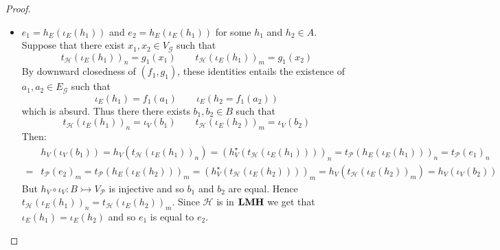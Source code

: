 \documentclass[3p]{elsarticle}
\newcommand{\catname}[1]{\textbf{\textup{#1}}}
\newcommand{\lmo}{\catname{LMH}}
\newcommand{\mto}{\rightarrowtail}
\theoremstyle{remark}
\theoremstyle{definition}
\begin{document}
\begin{proof}
\begin{itemize}
	\item $e_1=h_E(\iota_E(h_1))$ and $e_2=h_E(\iota_E(h_1))$ for some $h_1$ and $h_2\in A$.  Suppose that there exist $x_1, x_2\in V_{\mathcal{G}}$ such that
	\[t_{\mathcal{H}}(\iota_E(h_1))_n = g_1(x_1) \qquad t_{\mathcal{H}}(\iota_E(h_1))_m = g_1(x_2)\]
	By downward closedness of $(f_1, g_1)$, these identities entails the existence of $a_1, a_2\in E_{\mathcal{G}}$ such that 
	\[\iota_E(h_1)=f_1(a_1) \qquad \iota_E(h_2 = f_1(a_2))\]
	which is absurd. Thus there there exists $b_1, b_2\in B$ such that
	\[t_{\mathcal{H}}(\iota_E(h_1))_n=\iota_V(b_1) \qquad t_{\mathcal{H}}(\iota_E(h_2))_m=\iota_V(b_2)\]
	Then:
	\begin{align*}
	&h_V(\iota_V(b_1))=h_V(t_{\mathcal{H}}(\iota_E(h_1))_n)=(h^\star_V(t_{\mathcal{H}}(\iota_E(h_1))))_n=t_{\mathcal{P}}(h_E(\iota_E(h_1)))_n=t_{\mathcal{P}}(e_1)_n\\=&t_{\mathcal{P}}(e_2)_m=t_{\mathcal{P}}(h_E(\iota_E(h_2)))_m=(h^\star_V(t_{\mathcal{H}}(\iota_E(h_2))))_m=h_V(t_{\mathcal{H}}(\iota_E(h_2))_m)=h_V(\iota_V(b_2))
	\end{align*}
	But $h_V\circ \iota_V\colon B\mto V_{\mathcal{P}}$ is injective and so $b_1$ and $b_2$ are equal. Hence $t_{\mathcal{H}}(\iota_E(h_1))_n = t_{\mathcal{H}}(\iota_E(h_2))_m$. Since $\mathcal{H}$ is in $\lmo$ we get that $\iota_E(h_1)=\iota_E(h_2)$ and so $e_1$ is equal to $e_2$.
	\qedhere 
\end{itemize}
\end{proof}
\end{document}
